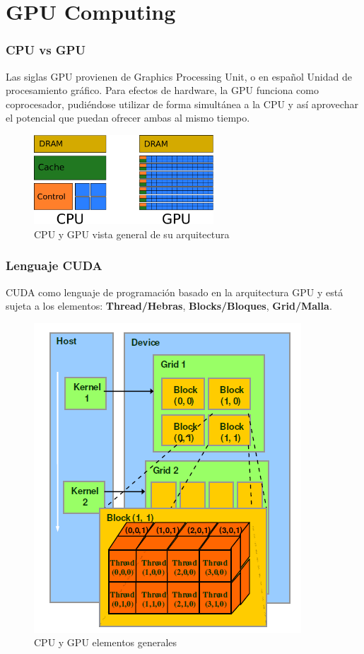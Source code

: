 \documentclass{beamer}
\begin{document}
	\section{GPU Computing}
        \begin{frame}
        \frametitle{CPU vs GPU}
        Las siglas GPU provienen de Graphics Processing Unit, o en español Unidad de
        procesamiento gráfico. Para efectos de hardware, la GPU funciona como
        coprocesador, pudiéndose utilizar de forma simultánea a la CPU y así aprovechar
        el potencial que puedan ofrecer ambas al mismo tiempo.

        \begin{figure}[h]
            \centering
            \includegraphics[width=0.6\textwidth]{img/cpu_gpu_arch.pdf}
            \caption{CPU y GPU vista general de su arquitectura}
            \label{fig:cpu_gpu_arch}
        \end{figure}
        \end{frame}

        \begin{frame}
        \frametitle{Lenguaje CUDA}
        CUDA como lenguaje de programación basado en la arquitectura 
        GPU y está sujeta a los elementos: \textbf{Thread/Hebras}, \textbf{Blocks/Bloques},
        \textbf{Grid/Malla}.
        
        \begin{figure}[h]
            \centering
            \includegraphics[height=0.5\textheight]{img/elements.png}
            \caption{CPU y GPU elementos generales}
            \label{fig:cpu_gpu_elements}
        \end{figure}
        \end{frame}
\end{document}
